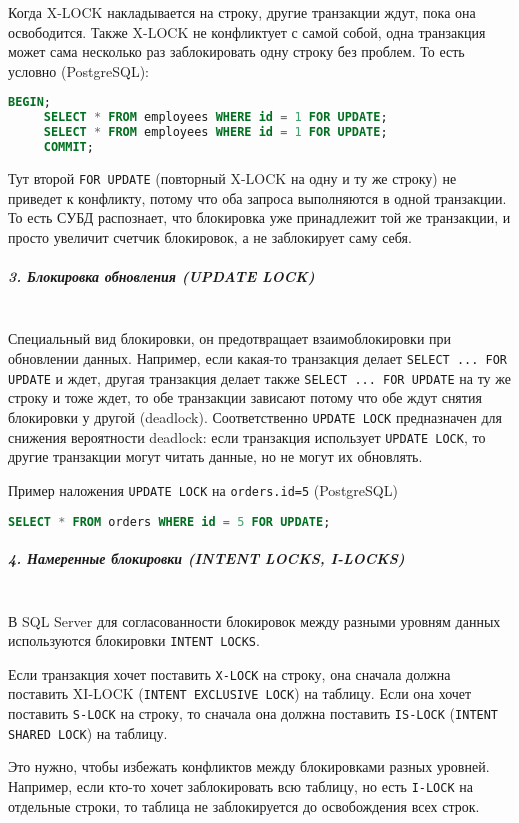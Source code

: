  Когда X-LOCK накладывается на строку, другие транзакции ждут, пока она освободится. Также X-LOCK не конфликтует с самой собой, одна транзакция может сама несколько раз заблокировать одну строку без проблем.
 То есть условно (PostgreSQL):
 \begin{lstlisting}[language=SQL]
     BEGIN;
     SELECT * FROM employees WHERE id = 1 FOR UPDATE;
     SELECT * FROM employees WHERE id = 1 FOR UPDATE;
     COMMIT;    
 \end{lstlisting}
 Тут второй \texttt{FOR UPDATE} (повторный X-LOCK на одну и ту же строку) не приведет к конфликту, потому что оба запроса выполняются в одной транзакции. То есть СУБД распознает, что блокировка уже принадлежит той же транзакции, и просто увеличит счетчик блокировок, а не заблокирует саму себя.
 
 \subparagraph{3. Блокировка обновления (UPDATE LOCK)} ~\\
 
 Специальный вид блокировки, он предотвращает взаимоблокировки при обновлении данных.
 Например, если какая-то транзакция делает \texttt{SELECT ... FOR UPDATE} и ждет, другая транзакция делает также \texttt{SELECT ... FOR UPDATE} на ту же строку и тоже ждет, то обе транзакции зависают потому что обе ждут снятия блокировки у другой (deadlock). 
 Соответственно \texttt{UPDATE LOCK} предназначен для снижения вероятности deadlock: если транзакция использует \texttt{UPDATE LOCK}, то другие транзакции могут читать данные, но не могут их обновлять.
 
 Пример наложения \texttt{UPDATE LOCK} на \texttt{orders.id=5} (PostgreSQL)
 \begin{lstlisting}[language=SQL]
     SELECT * FROM orders WHERE id = 5 FOR UPDATE;
 \end{lstlisting}
 
 \subparagraph{4. Намеренные блокировки (INTENT LOCKS, I-LOCKS)} ~\\
 
 В SQL Server для согласованности блокировок между разными уровням данных используются блокировки \texttt{INTENT LOCKS}. \autocite{MicrosoftLearnSQLserverTransLock}
 
 Если транзакция хочет поставить \texttt{X-LOCK} на строку, она сначала должна поставить XI-LOCK (\texttt{INTENT EXCLUSIVE LOCK}) на таблицу. Если она хочет поставить \texttt{S-LOCK} на строку, то сначала она должна поставить \texttt{IS-LOCK} (\texttt{INTENT SHARED LOCK}) на таблицу.
 
 Это нужно, чтобы избежать конфликтов между блокировками разных уровней. Например, если кто-то хочет заблокировать всю таблицу, но есть \texttt{I-LOCK} на отдельные строки, то таблица не заблокируется до освобождения всех строк.
 
